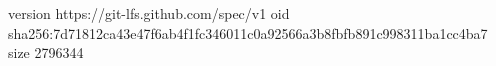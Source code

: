 version https://git-lfs.github.com/spec/v1
oid sha256:7d71812ca43e47f6ab4f1fc346011c0a92566a3b8fbfb891c998311ba1cc4ba7
size 2796344
